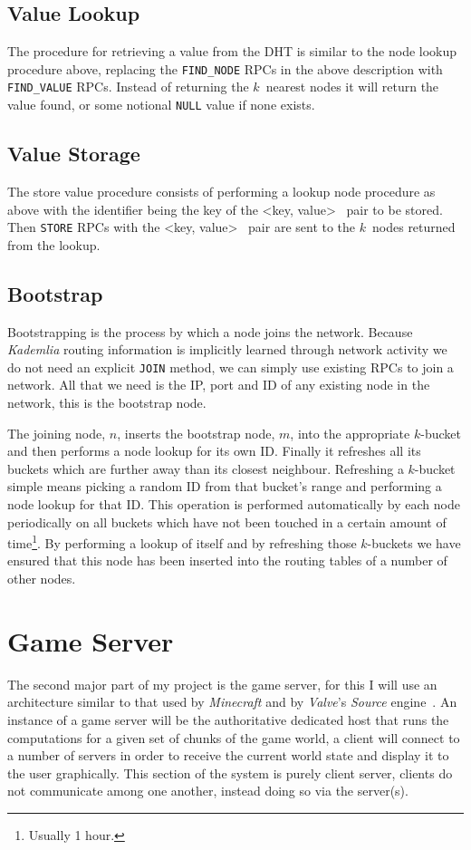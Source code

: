 \documentclass[10pt,twoside,notitlepage,a4paper]{report}
\newcommand{\kademlia}{\emph{Kademlia}}
\newcommand{\K}{$k$}
\begin{document}
	\subsection{Value Lookup}
	The procedure for retrieving a value from the DHT is similar to the node lookup procedure above, replacing the \texttt{FIND\_NODE} RPCs in the above description with \texttt{FIND\_VALUE} RPCs. Instead of returning the \K~nearest nodes it will return the value found, or some notional \texttt{NULL} value if none exists.
	
	\subsection{Value Storage}
	The store value procedure consists of performing a lookup node procedure as above with the identifier being the key of the \textless key, value\textgreater~ pair to be stored. Then \texttt{STORE} RPCs with the \textless key, value\textgreater~ pair are sent to the \K~nodes returned from the lookup.
	
	\subsection{Bootstrap}
	Bootstrapping is the process by which a node joins the network. Because \kademlia{} routing information is implicitly learned through network activity we do not need an explicit \texttt{JOIN} method, we can simply use existing RPCs to join a network. All that we need is the IP, port and ID of any existing node in the network, this is the bootstrap node.
	
	The joining node, $n$, inserts the bootstrap node, $m$, into the appropriate \K-bucket and then performs a node lookup for its own ID. Finally it refreshes all its buckets which are further away than its closest neighbour. Refreshing a \K-bucket simple means picking a random ID from that bucket's range and performing a node lookup for that ID. This operation is performed automatically by each node periodically on all buckets which have not been touched in a certain amount of time\footnote{Usually 1 hour.}. By performing a lookup of itself and by refreshing those \K-buckets we have ensured that this node has been inserted into the routing tables of a number of other nodes.
	
	\section{Game Server}
	The second major part of my project is the game server, for this I will use an architecture similar to that used by \emph{Minecraft} and by \emph{Valve}'s \emph{Source} engine~\cite{source}. An instance of a game server will be the authoritative dedicated host that runs the computations for a given set of chunks of the game world, a client will connect to a number of servers in order to receive the current world state and display it to the user graphically. This section of the system is purely client server, clients do not communicate among one another, instead doing so via the server(s).
	
\end{document}
